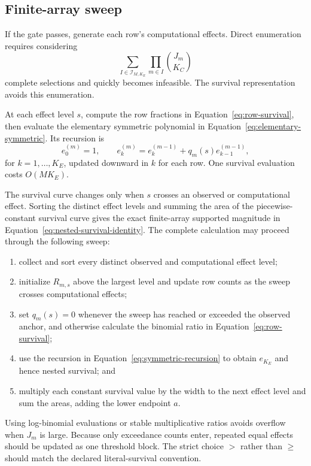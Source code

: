 \documentclass[11pt]{article}
\theoremstyle{remark}
\begin{document}
\subsection{Finite-array sweep}

If the gate passes, generate each row's computational effects. Direct
enumeration requires considering
\[
\sum_{I\in\mathcal I_{M,K_E}}
\prod_{m\in I}\binom{J_m}{K_C}
\]
complete selections and quickly becomes infeasible. The survival
representation avoids this enumeration.

At each effect level $s$, compute the row fractions in
Equation~\eqref{eq:row-survival}, then evaluate the elementary symmetric
polynomial in Equation~\eqref{eq:elementary-symmetric}. Its recursion is
\begin{equation}
e_0^{(m)}=1,
\qquad
e_k^{(m)}
=
e_k^{(m-1)}+q_m(s)e_{k-1}^{(m-1)},
\label{eq:symmetric-recursion}
\end{equation}
for $k=1,\ldots,K_E$, updated downward in $k$ for each row. One survival
evaluation costs $O(MK_E)$.

The survival curve changes only when $s$ crosses an observed or computational
effect. Sorting the distinct effect levels and summing the area of the
piecewise-constant survival curve gives the exact finite-array supported
magnitude in Equation~\eqref{eq:nested-survival-identity}. The complete
calculation may proceed through the following sweep:
\begin{enumerate}
\item collect and sort every distinct observed and computational effect level;
\item initialize $R_{m,s}$ above the largest level and update row counts as the
sweep crosses computational effects;
\item set $q_m(s)=0$ whenever the sweep has reached or exceeded the observed
anchor, and otherwise calculate the binomial ratio in
Equation~\eqref{eq:row-survival};
\item use the recursion in Equation~\eqref{eq:symmetric-recursion} to obtain
$e_{K_E}$ and hence nested survival; and
\item multiply each constant survival value by the width to the next effect
level and sum the areas, adding the lower endpoint $a$.
\end{enumerate}
Using log-binomial evaluations or stable multiplicative ratios avoids overflow
when $J_m$ is large. Because only exceedance counts enter, repeated equal
effects should be updated as one threshold block. The strict choice $>$ rather
than $\geq$ should match the declared literal-survival convention.
\end{document}
